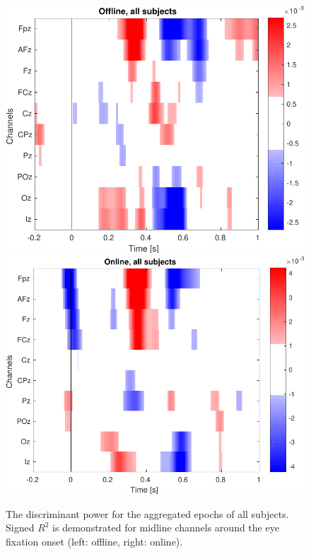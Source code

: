 \documentclass[12pt]{iopart}
\begin{document}
\begin{figure}[h]
    \vspace{0.5cm}
    \includegraphics[trim={0cm 0cm 0cm 0cm},clip,height=0.4\columnwidth]{../images/Signr2_Offline_chCz_allsubjects.pdf}
    \includegraphics[trim={0cm 0cm 0cm 0cm},clip,height=0.4\columnwidth]{../images/Signr2_Online_chCz_allsubjects.pdf}
    \caption{The discriminant power for the aggregated epochs of
        all subjects.
    Signed $R^2$ is demonstrated for midline channels around the eye fixation onset
    (left: offline, right: online).}
\label{fig:signRtime}
\end{figure}
\end{document}

